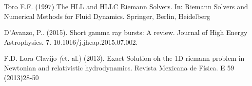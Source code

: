 \documentclass[12pt,a4paper]{book}
\begin{document}
\begin{thebibliography}{20}
    Toro E.F. (1997) The HLL and HLLC Riemann Solvers. In: Riemann Solvers and Numerical Methods for Fluid Dynamics. Springer, Berlin, Heidelberg
    
    D'Avanzo, P.. (2015). Short gamma ray bursts: A review. Journal of High Energy Astrophysics. 7. 10.1016/j.jheap.2015.07.002. 
    
    F.D. Lora-Clavijo \emph(et. al.) (2013). Exact Solution oh the 1D riemann problem in Newtonian and relativistic hydrodynamics. Revista Mexicana de Física. E 59 (2013)28-50 
    \end{thebibliography}
    
    
    
\end{document}
